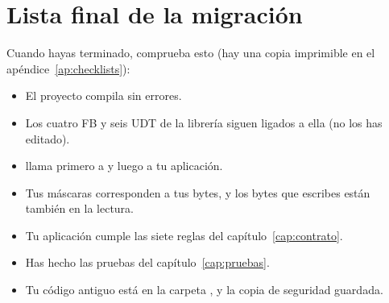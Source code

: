 \section{Lista final de la migración}
Cuando hayas terminado, comprueba esto (hay una copia imprimible en el apéndice~\ref{ap:checklists}):
\begin{itemize}
\item[$\square$] El proyecto compila sin errores.
\item[$\square$] Los cuatro FB y seis UDT de la librería siguen ligados a ella (no los has editado).
\item[$\square$]  llama primero a  y luego a tu aplicación.
\item[$\square$] Tus máscaras corresponden a tus bytes, y los bytes que escribes están también en la lectura.
\item[$\square$] Tu aplicación cumple las siete reglas del capítulo~\ref{cap:contrato}.
\item[$\square$] Has hecho las pruebas del capítulo~\ref{cap:pruebas}.
\item[$\square$] Tu código antiguo está en la carpeta , y la copia de seguridad guardada.
\end{itemize}
